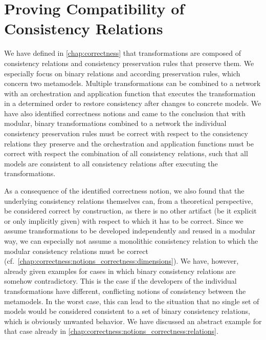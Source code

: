 \chapter{Proving Compatibility of Consistency Relations
}
\label{chap:compatibility}


We have defined in \autoref{chap:correctness} that transformations are composed of \glspl{consistency relation} and \glspl{consistency preservation rule} that preserve them.
We especially focus on binary relations and according preservation rules, which concern two metamodels.
Multiple transformations can be combined to a network with an orchestration and application function that executes the transformation in a determined order to restore consistency after changes to concrete models.
We have also identified correctness notions and came to the conclusion that with modular, binary transformations combined to a network the individual consistency preservation rules must be correct with respect to the consistency relations they preserve and the orchestration and application functions must be correct with respect the combination of all consistency relations, such that all models are consistent to all consistency relations after executing the transformations.

As a consequence of the identified correctness notion, we also found that the underlying consistency relations themselves can, from a theoretical perspective, be considered correct by construction, as there is no other artifact (be it explicit or only implicitly given) with respect to which it has to be correct.
Since we assume transformations to be developed independently and reused in a modular way, we can especially not assume a monolithic consistency relation to which the modular consistency relations must be correct (cf.\ \autoref{chap:correctness:notions_correctness:dimensions}).
We have, however, already given examples for cases in which binary consistency relations are somehow contradictory.
This is the case if the developers of the individual transformations have different, conflicting notions of consistency between the metamodels.
In the worst case, this can lead to the situation that no single set of models would be considered consistent to a set of binary consistency relations, which is obviously unwanted behavior.
We have discussed an abstract example for that case already in \autoref{chap:correctness:notions_correctness:relations}.

